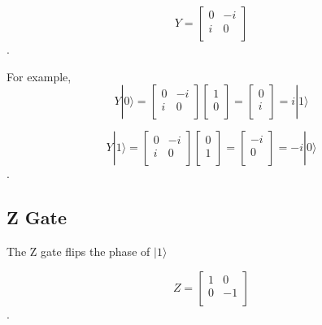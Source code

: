 \begin{equation}
 Y = \begin{bmatrix}
0 & -i \\
i & 0 \\
\end{bmatrix}
\end{equation}.

For example,
\begin{equation}
Y|0\rangle = \begin{bmatrix}
0 & -i \\
i & 0 \\
\end{bmatrix} 
\left[
\begin{array}{c}
1 \\
0 \\
\end{array}
\right]
= \left[
\begin{array}{c}
0 \\
i \\
\end{array}
\right]
= i|1\rangle
\end{equation}

\begin{equation}
Y|1\rangle = \begin{bmatrix}
0 & -i \\
i & 0 \\
\end{bmatrix} 
\left[
\begin{array}{c}
0 \\
1  \\
\end{array}
\right]
= \left[
\begin{array}{c}
-i \\
0 \\
\end{array}
\right]
= -i|0\rangle
\end{equation}.

\subsection{Z Gate}
The Z gate flips the phase of $ |1\rangle$

\begin{equation}
 Z = \begin{bmatrix}
1 & 0 \\
0 & -1 \\
\end{bmatrix}
\end{equation}.

